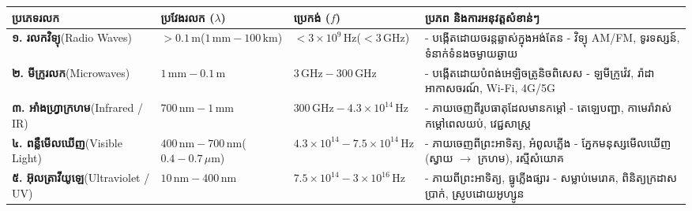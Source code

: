 \vspace{0.3em}
\begin{center}
\small
\setlength{\tabcolsep}{4pt}
\renewcommand{\arraystretch}{1.25}
\begin{tabular}{|p{2.6cm}|p{2.6cm}|p{2.8cm}|p{7.2cm}|}
	\hline
	\rowcolor{primary!15}
	\textbf{\textcolor{brownheader}{ប្រភេទរលក}} & 
	\textbf{\textcolor{brownheader}{ប្រវែងរលក ($\lambda$)}} & 
	\textbf{\textcolor{brownheader}{ប្រេកង់ ($f$)}} & 
	\textbf{\textcolor{brownheader}{ប្រភព និងការអនុវត្តសំខាន់ៗ}} \\
	\hline
	\textbf{១. រលកវិទ្យុ}\newline({\englishfont Radio Waves}) & 
	$> 0.1\,\text{m}$\newline($1\,\text{mm} - 100\,\text{km}$) & 
	$< 3 \times 10^9\,\text{Hz}$\newline($< 3\,\text{GHz}$) & 
	- បង្កើតដោយចរន្តឆ្លាស់ក្នុងអង់តែន\newline
	- វិទ្យុ AM/FM, ទូរទស្សន៍, ទំនាក់ទំនងចម្ងាយឆ្ងាយ \\
	\hline
	\textbf{២. មីក្រូរលក}\newline({\englishfont Microwaves}) & 
	$1\,\text{mm} - 0.1\,\text{m}$ & 
	$3\,\text{GHz} - 300\,\text{GHz}$ & 
	- បង្កើតដោយបំពង់អេឡិចត្រូនិចពិសេស\newline
	- ឡមីក្រូវ៉េវ, រ៉ាដាអាកាសចរណ៍, Wi-Fi, 4G/5G \\
	\hline
	\textbf{៣. អាំងហ្វ្រាក្រហម}\newline({\englishfont Infrared / IR}) & 
	$700\,\text{nm} - 1\,\text{mm}$ & 
	$300\,\text{GHz} - 4.3 \times 10^{14}\,\text{Hz}$ & 
	- ភាយចេញពីរូបធាតុដែលមានកម្ដៅ\newline
	- តេឡេបញ្ជា, កាមេរ៉ាវាស់កម្ដៅពេលយប់, វេជ្ជសាស្ត្រ \\
	\hline
	\textbf{៤. ពន្លឺមើលឃើញ}\newline({\englishfont Visible Light}) & 
	$400\,\text{nm} - 700\,\text{nm}$\newline($0.4 - 0.7\,\mu\text{m}$) & 
	$4.3 \times 10^{14} - 7.5 \times 10^{14}\,\text{Hz}$ & 
	- ភាយចេញពីព្រះអាទិត្យ, អំពូលភ្លើង\newline
	- ភ្នែកមនុស្សមើលឃើញ (ស្វាយ $\to$ ក្រហម), រស្មីសំយោគ \\
	\hline
	\textbf{៥. អ៊ុលត្រាវីយូឡេ}\newline({\englishfont Ultraviolet / UV}) & 
	$10\,\text{nm} - 400\,\text{nm}$ & 
	$7.5 \times 10^{14} - 3 \times 10^{16}\,\text{Hz}$ & 
	- ភាយពីព្រះអាទិត្យ, ធ្នូភ្លើងផ្សារ\newline
	- សម្លាប់មេរោគ, ពិនិត្យក្រដាសប្រាក់, ស្រូបដោយអូហ្សូន \\

\end{tabular}
\end{center}
